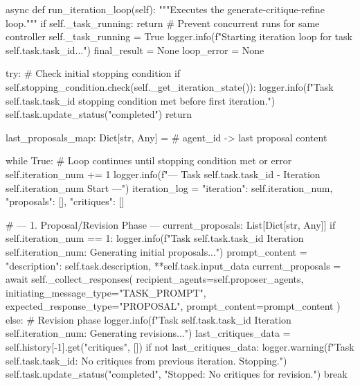 \documentclass{amsbook}
\theoremstyle{definition}
\theoremstyle{remark}
\numberwithin{equation}{chapter} %
\begin{document}
\begin{python}
    async def run_iteration_loop(self):
        """Executes the generate-critique-refine loop."""
        if self._task_running: return # Prevent concurrent runs for same controller
        self._task_running = True
        logger.info(f"Starting iteration loop for task {self.task.task_id}...")
        final_result = None
        loop_error = None

        try:
            # Check initial stopping condition
            if self.stopping_condition.check(self._get_iteration_state()):
                logger.info(f"Task {self.task.task_id} stopping condition met before first iteration.")
                self.task.update_status("completed")
                return

            last_proposals_map: Dict[str, Any] = {} # agent_id -> last proposal content

            while True: # Loop continues until stopping condition met or error
                self.iteration_num += 1
                logger.info(f"--- Task {self.task.task_id} - Iteration {self.iteration_num} Start ---")
                iteration_log = {"iteration": self.iteration_num, "proposals": [], "critiques": []}

                # --- 1. Proposal/Revision Phase ---
                current_proposals: List[Dict[str, Any]]
                if self.iteration_num == 1:
                    logger.info(f"Task {self.task.task_id} Iteration {self.iteration_num}: Generating initial proposals...")
                    prompt_content = {"description": self.task.description, **self.task.input_data}
                    current_proposals = await self._collect_responses(
                        recipient_agents=self.proposer_agents,
                        initiating_message_type="TASK_PROMPT",
                        expected_response_type="PROPOSAL",
                        prompt_content=prompt_content
                    )
                else: # Revision phase
                    logger.info(f"Task {self.task.task_id} Iteration {self.iteration_num}: Generating revisions...")
                    last_critiques_data = self.history[-1].get("critiques", [])
                    if not last_critiques_data:
                        logger.warning(f"Task {self.task.task_id}: No critiques from previous iteration. Stopping.")
                        self.task.update_status("completed", "Stopped: No critiques for revision.")
                        break


\end{python}
\end{document}
